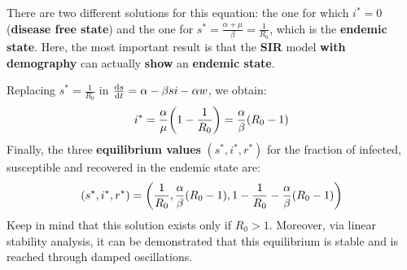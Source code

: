 \documentclass[../main/main.tex]{subfiles}
\begin{document}
There are two different solutions for this equation: the one for which \( i^* = 0 \) (\textbf{disease free state}) and the one for \( s^* = \frac{\alpha + \mu }{\beta } = \frac{1}{R_0} \), which is the \textbf{endemic state}. Here, the most important result is that the \textbf{SIR} model \textbf{with demography} can actually \textbf{show} an \textbf{endemic state}.

Replacing \( s^* = \frac{1}{R_0} \) in \( \dv{s}{t} = \alpha - \beta s i - \alpha w  \), we obtain:
\begin{equation*}
  i^* = \frac{\alpha }{\mu } \qty(1 - \frac{1}{R_0}) = \frac{\alpha }{\beta } (R_0 -1)
\end{equation*}
Finally, the three \textbf{equilibrium values} $(s^*, i^*, r^*)$ for the fraction of infected, susceptible and recovered in the endemic state are:
\begin{equation}
  (s^*, i^*, r^*) = \qty( \frac{1}{R_0}, \frac{\alpha }{\beta } (R_0 -1 ), 1- \frac{1}{R_0} - \frac{\alpha }{\beta } (R_0-1))
\end{equation}
Keep in mind that this solution exists only if \( R_0>1 \). Moreover, via linear stability analysis, it can be demonstrated that this equilibrium is stable and is reached through damped oscillations.
\end{document}
